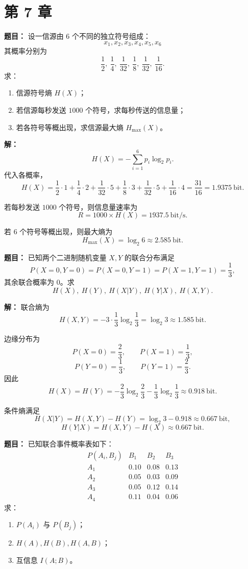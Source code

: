 \section*{第 7 章}

\textbf{题目：}
设一信源由 6 个不同的独立符号组成：
\[
x_1,x_2,x_3,x_4,x_5,x_6
\]
其概率分别为
\[
\frac12,\ \frac14,\ \frac1{32},\ \frac18,\ \frac1{32},\ \frac1{16}.
\]
求：
\begin{enumerate}
\item 信源符号熵 $H(X)$；
\item 若信源每秒发送 $1000$ 个符号，求每秒传送的信息量；
\item 若各符号等概出现，求信源最大熵 $H_{\max}(X)$。
\end{enumerate}

\par\textbf{解：}
\[
H(X)=-\sum_{i=1}^6 p_i\log_2 p_i.
\]
代入各概率，
\[
H(X)=\frac12\cdot 1+\frac14\cdot 2+\frac1{32}\cdot 5+\frac18\cdot 3+\frac1{32}\cdot 5+\frac1{16}\cdot 4
=\frac{31}{16}=1.9375\ \text{bit}.
\]

若每秒发送 $1000$ 个符号，则信息量速率为
\[
R=1000\times H(X)=1937.5\ \text{bit/s}.
\]

若 6 个符号等概出现，则最大熵为
\[
H_{\max}(X)=\log_2 6\approx 2.585\ \text{bit}.
\]

\medskip
{}
\textbf{题目：}
已知两个二进制随机变量 $X,Y$ 的联合分布满足
\[
P(X=0,Y=0)=P(X=0,Y=1)=P(X=1,Y=1)=\frac13,
\]
其余联合概率为 0。求
\[
H(X),\ H(Y),\ H(X|Y),\ H(Y|X),\ H(X,Y).
\]

\par\textbf{解：}
联合熵为
\[
H(X,Y)=-3\cdot \frac13\log_2\frac13=\log_2 3\approx 1.585\ \text{bit}.
\]

边缘分布为
\[
P(X=0)=\frac23,\qquad P(X=1)=\frac13,
\]
\[
P(Y=0)=\frac13,\qquad P(Y=1)=\frac23.
\]
因此
\[
H(X)=H(Y)=-\frac23\log_2\frac23-\frac13\log_2\frac13\approx 0.918\ \text{bit}.
\]

条件熵满足
\[
H(X|Y)=H(X,Y)-H(Y)=\log_2 3-0.918\approx 0.667\ \text{bit},
\]
\[
H(Y|X)=H(X,Y)-H(X)\approx 0.667\ \text{bit}.
\]

\medskip
{}
\textbf{题目：}
已知联合事件概率表如下：
\[
\begin{array}{c|ccc}
P(A_i,B_j) & B_1 & B_2 & B_3\\
\hline
A_1 & 0.10 & 0.08 & 0.13\\
A_2 & 0.05 & 0.03 & 0.09\\
A_3 & 0.05 & 0.12 & 0.14\\
A_4 & 0.11 & 0.04 & 0.06
\end{array}
\]
求：
\begin{enumerate}
\item $P(A_i)$ 与 $P(B_j)$；
\item $H(A),H(B),H(A,B)$；
\item 互信息 $I(A;B)$。
\end{enumerate}

